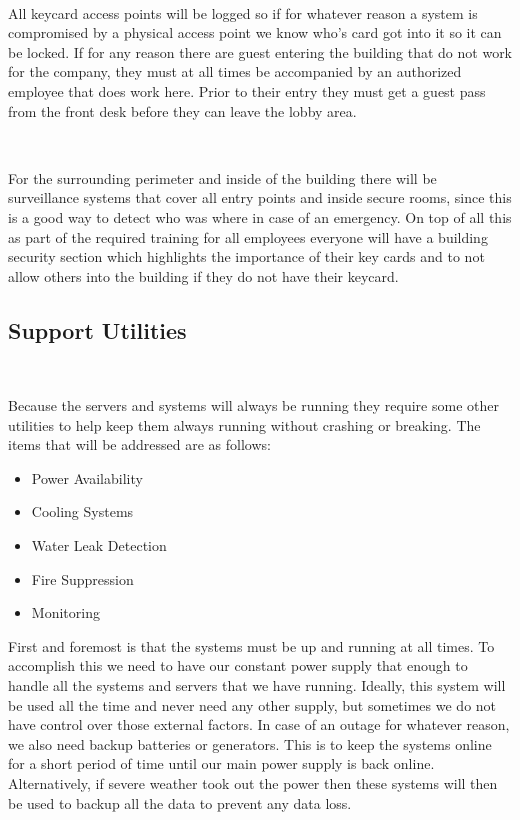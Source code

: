 \documentclass[12pt,a4paper]{report}
\begin{document}
\

All keycard access points will be logged so if for whatever reason a system is compromised by a physical access point we know who's card got into it so it can be locked.
If for any reason there are guest entering the building that do not work for the company, they must at all times be accompanied by an authorized employee that does work here.
Prior to their entry they must get a guest pass from the front desk before they can leave the lobby area.

\

For the surrounding perimeter and inside of the building there will be surveillance systems that cover all entry points and inside secure rooms, since this is a good way to detect who was where in case of an emergency.
On top of all this as part of the required training for all employees everyone will have a building security section which highlights the importance of their key cards and to not allow others into the building if they do not have their keycard.

\subsection{Support Utilities}
\

Because the servers and systems will always be running they require some other utilities to help keep them always running without crashing or breaking.
The items that will be addressed are as follows:
\begin{itemize}
 \item Power Availability
 \item Cooling Systems
 \item Water Leak Detection
 \item Fire Suppression
 \item Monitoring
\end{itemize}

First and foremost is that the systems must be up and running at all times.
To accomplish this we need to have our constant power supply that enough to handle all the systems and servers that we have running.
Ideally, this system will be used all the time and never need any other supply, but sometimes we do not have control over those external factors.
In case of an outage for whatever reason, we also need backup batteries or generators. 
This is to keep the systems online for a short period of time until our main power supply is back online.
Alternatively, if severe weather took out the power then these systems will then be used to backup all the data to prevent any data loss.
\end{document}
